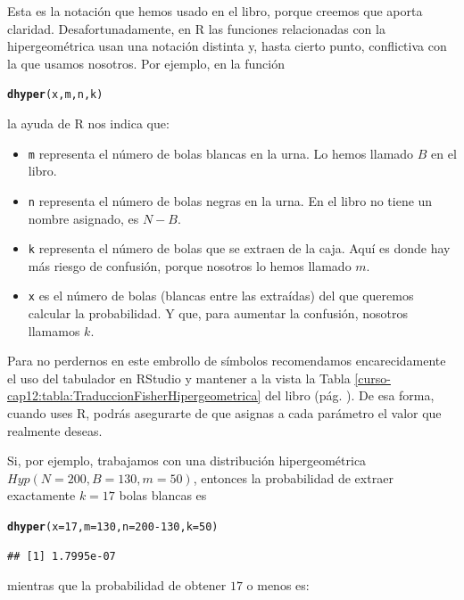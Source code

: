 \documentclass[10pt,a4paper]{article}\usepackage[]{graphicx}\usepackage[]{color}
\makeatletter
\newcommand{\hlnum}[1]{\textcolor[rgb]{0.686,0.059,0.569}{#1}}%
\newcommand{\hlopt}[1]{\textcolor[rgb]{0,0,0}{#1}}%
\newcommand{\hlstd}[1]{\textcolor[rgb]{0.345,0.345,0.345}{#1}}%
\newcommand{\hlkwc}[1]{\textcolor[rgb]{0.333,0.667,0.333}{#1}}%
\newcommand{\hlkwd}[1]{\textcolor[rgb]{0.737,0.353,0.396}{\textbf{#1}}}%
\newenvironment{kframe}{%
 \def\at@end@of@kframe{}%
 \ifinner\ifhmode%
  \def\at@end@of@kframe{\end{minipage}}%
  \begin{minipage}{\columnwidth}%
 \fi\fi%
 \def\FrameCommand##1{\hskip\@totalleftmargin \hskip-\fboxsep
 \colorbox{shadecolor}{##1}\hskip-\fboxsep
     \hskip-\linewidth \hskip-\@totalleftmargin \hskip\columnwidth}%
 \MakeFramed {\advance\hsize-\width
   \@totalleftmargin\z@ \linewidth\hsize
   \@setminipage}}%
 {\par\unskip\endMakeFramed%
 \at@end@of@kframe}
\newenvironment{knitrout}{}{} %
\makeatother
\begin{document}
Esta es la notación que hemos usado en el libro, porque creemos que aporta claridad. Desafortunadamente, en R las funciones relacionadas con la hipergeométrica usan una notación distinta y, hasta cierto punto, conflictiva con la que usamos nosotros. Por ejemplo, en la función
\begin{knitrout}
\color{fgcolor}\begin{kframe}
\begin{alltt}
\hlkwd{dhyper}\hlstd{(x, m, n, k)}
\end{alltt}
\end{kframe}
\end{knitrout}
la ayuda de R nos indica que:
\begin{itemize}
  \item {\tt m} representa el número de bolas blancas en la urna. Lo hemos llamado $B$ en el libro.
  \item {\tt n} representa el número de bolas negras en la urna.  En el libro no tiene un nombre asignado, es $N - B$.
  \item {\tt k} representa el número de bolas que se extraen de la caja. Aquí es donde hay más riesgo de confusión, porque nosotros lo hemos llamado $m$.
  \item {\tt x} es el número de bolas (blancas entre las extraídas) del que queremos calcular la probabilidad. Y que, para aumentar la confusión, nosotros llamamos $k$.
\end{itemize}
Para no perdernos en este embrollo de símbolos recomendamos encarecidamente el uso del tabulador en RStudio y mantener a la vista la Tabla \ref{curso-cap12:tabla:TraduccionFisherHipergeometrica} del libro (pág. \pageref{curso-cap12:tabla:TraduccionFisherHipergeometrica}). De esa forma, cuando uses R, podrás asegurarte de que asignas a cada parámetro el valor que realmente deseas.

Si, por ejemplo, trabajamos con una distribución hipergeométrica $Hyp(N=200, B=130, m=50)$, entonces la probabilidad de extraer exactamente $k=17$ bolas blancas es

\begin{knitrout}
\color{fgcolor}\begin{kframe}
\begin{alltt}
\hlkwd{dhyper}\hlstd{(}\hlkwc{x} \hlstd{=} \hlnum{17}\hlstd{,} \hlkwc{m} \hlstd{=} \hlnum{130}\hlstd{,} \hlkwc{n} \hlstd{=} \hlnum{200} \hlopt{-} \hlnum{130}\hlstd{,} \hlkwc{k} \hlstd{=} \hlnum{50}\hlstd{)}
\end{alltt}
\begin{verbatim}
## [1] 1.7995e-07
\end{verbatim}
\end{kframe}
\end{knitrout}
mientras que la probabilidad de obtener $17$ o menos es:
\end{document}
